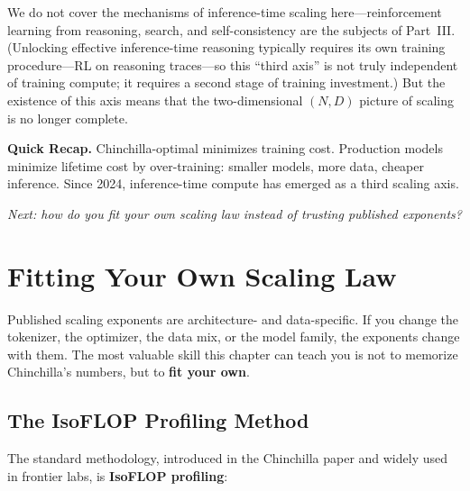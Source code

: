 We do not cover the mechanisms of inference-time scaling here---reinforcement learning from reasoning, search, and self-consistency are the subjects of Part~III. (Unlocking effective inference-time reasoning typically requires its own training procedure---RL on reasoning traces---so this ``third axis'' is not truly independent of training compute; it requires a second stage of training investment.) But the existence of this axis means that the two-dimensional $(N, D)$ picture of scaling is no longer complete.


\begin{quickrecap}
\textbf{Quick Recap.} Chinchilla-optimal minimizes training cost. Production models minimize lifetime cost by over-training: smaller models, more data, cheaper inference. Since 2024, inference-time compute has emerged as a third scaling axis.

\textit{Next: how do you fit your own scaling law instead of trusting published exponents?}
\end{quickrecap}



\section{Fitting Your Own Scaling Law}
\label{sec:fitting}

Published scaling exponents are architecture- and data-specific. If you change the tokenizer, the optimizer, the data mix, or the model family, the exponents change with them. The most valuable skill this chapter can teach you is not to memorize Chinchilla's numbers, but to \textbf{fit your own}.

\subsection{The IsoFLOP Profiling Method}
\label{sec:isoflop}

The standard methodology, introduced in the Chinchilla paper and widely used in frontier labs, is \textbf{IsoFLOP profiling}:

